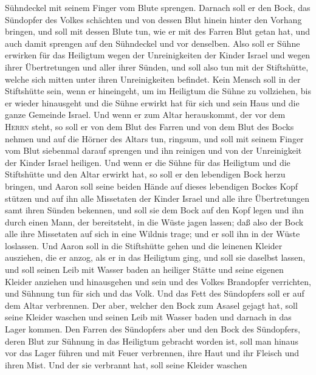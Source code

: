 Sühndeckel mit seinem Finger vom Blute sprengen.  Darnach
soll er den Bock, das Sündopfer des Volkes schächten und von dessen Blut
hinein hinter den Vorhang bringen, und soll mit dessen Blute tun, wie er
mit des Farren Blut getan hat, und auch damit sprengen auf den
Sühndeckel und vor denselben.  Also soll er Sühne
erwirken für das Heiligtum wegen der Unreinigkeiten der Kinder Israel
und wegen ihrer Übertretungen und aller ihrer Sünden, und soll also tun
mit der Stiftshütte, welche sich mitten unter ihren Unreinigkeiten
befindet.  Kein Mensch soll in der Stiftshütte sein, wenn
er hineingeht, um im Heiligtum die Sühne zu vollziehen, bis er wieder
hinausgeht und die Sühne erwirkt hat für sich und sein Haus und die
ganze Gemeinde Israel.  Und wenn er zum Altar
herauskommt, der vor dem \textsc{Herrn} steht, so soll er von dem Blut
des Farren und von dem Blut des Bocks nehmen und auf die Hörner des
Altars tun, ringsum,  und soll mit seinem Finger vom Blut
siebenmal darauf sprengen und ihn reinigen und von der Unreinigkeit der
Kinder Israel heiligen.  Und wenn er die Sühne für das
Heiligtum und die Stiftshütte und den Altar erwirkt hat, so soll er den
lebendigen Bock herzu bringen,  und Aaron soll seine
beiden Hände auf dieses lebendigen Bockes Kopf stützen und auf ihn alle
Missetaten der Kinder Israel und alle ihre Übertretungen samt ihren
Sünden bekennen, und soll sie dem Bock auf den Kopf legen und ihn durch
einen Mann, der bereitsteht, in die Wüste jagen lassen; 
daß also der Bock alle ihre Missetaten auf sich in eine Wildnis trage;
und er soll ihn in der Wüste loslassen.  Und Aaron soll
in die Stiftshütte gehen und die leinenen Kleider ausziehen, die er
anzog, als er in das Heiligtum ging, und soll sie daselbst lassen,
 und soll seinen Leib mit Wasser baden an heiliger Stätte
und seine eigenen Kleider anziehen und hinausgehen und sein und des
Volkes Brandopfer verrichten, und Sühnung tun für sich und das Volk.
 Und das Fett des Sündopfers soll er auf dem Altar
verbrennen.  Der aber, welcher den Bock zum Asasel gejagt
hat, soll seine Kleider waschen und seinen Leib mit Wasser baden und
darnach in das Lager kommen.  Den Farren des Sündopfers
aber und den Bock des Sündopfers, deren Blut zur Sühnung in das
Heiligtum gebracht worden ist, soll man hinaus vor das Lager führen und
mit Feuer verbrennen, ihre Haut und ihr Fleisch und ihren Mist.
 Und der sie verbrannt hat, soll seine Kleider waschen

